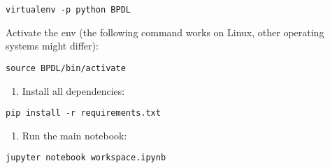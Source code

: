 \begin{verbatim}
virtualenv -p python BPDL
\end{verbatim}

Activate the env (the following command works on Linux, other operating
systems might differ):

\begin{verbatim}
source BPDL/bin/activate
\end{verbatim}

\begin{enumerate}
\def\labelenumi{\arabic{enumi}.}
\setcounter{enumi}{2}
\tightlist
\item
  Install all dependencies:
\end{enumerate}

\begin{verbatim}
pip install -r requirements.txt
\end{verbatim}

\begin{enumerate}
\def\labelenumi{\arabic{enumi}.}
\setcounter{enumi}{3}
\tightlist
\item
  Run the main notebook:
\end{enumerate}

\begin{verbatim}
jupyter notebook workspace.ipynb
\end{verbatim}
